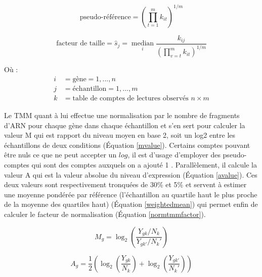 \begin{equation}\label{pseudoref}
    \text{pseudo-référence} = \left(\prod_{t=1}^{m} k_{i t}\right)^{1 / m}
\end{equation}

\begin{equation}\label{sizefactor}
    \text{facteur de taille} = \hat{s}_{j}=\underset{i}{\operatorname{median}} \frac{k_{i j}}{\left(\prod_{v=t}^{m} k_{i t}\right)^{1 / m}}
\end{equation}


Où :
\begin{align*}
i & = \text{gène} = 1,..., n \\
j & = \text{échantillon} = 1,..., m \\
k & = \text{table de comptes de lectures observés } n \times m 
\end{align*}

Le TMM quant à lui effectue une normalisation par le nombre de fragments d'ARN pour chaque gène dans chaque échantillon et s'en sert pour calculer la valeur M qui est rapport du niveau moyen en base 2, soit un log2 entre les échantillons de deux conditions (Équation \ref{mvalue}). Certains comptes pouvant être nuls ce que ne peut accepter un $log$, il est d'usage d'employer des pseudo-comptes qui sont des comptes auxquels on a ajouté 1 \cite{Booeshaghi2021Mar}. Parallèlement, il calcule la valeur A qui est la valeur absolue du niveau d'expression (Équation \ref{avalue}). Ces deux valeurs sont respectivement tronquées de 30\% et 5\% et servent à estimer une moyenne pondérée par référence (l'échantillon au quartile haut le plus proche de la moyenne des quartiles haut) (Équation \ref{weightedmean}) qui permet enfin de calculer le facteur de normalisation (Équation \ref{normtmmfactor}).

\begin{equation}\label{mvalue}
    M_g = \log_{2} \left(\frac{Y_{gk} / N_k}{Y_{gk'} / N_k'}\right)
\end{equation}

\begin{equation}\label{avalue}
    A_g = \frac{1}{2} \left(\log_{2} \left(\frac{Y_{gk}}{N_k} \right) + \log_2 \left(\frac{Y_{gk'}}{N_k'}\right)\right)
\end{equation}


